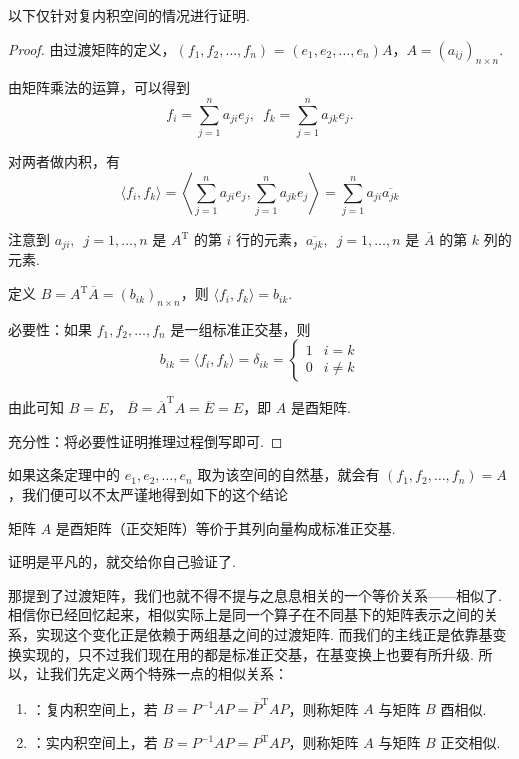 以下仅针对复内积空间的情况进行证明.

\begin{proof}
    由过渡矩阵的定义，$ (f_1, f_2, \ldots , f_n) $ = $ (e_1, e_2, \ldots , e_n)A $，$ A = (a_{ij})_{n \times n} $.

    由矩阵乘法的运算，可以得到
    \[ f_i = \sum_{j = 1}^{n} a_{ji}e_j , \enspace f_k = \sum_{j = 1}^{n} a_{jk}e_j. \]

    对两者做内积，有
    \[ \langle f_i, f_k \rangle = \left\langle \sum_{j = 1}^{n} a_{ji}e_j, \sum_{j = 1}^{n} a_{jk}e_j \right\rangle = \sum_{j = 1}^{n} a_{ji}\overline{a_{jk}} \]

    注意到 $ a_{ji},\enspace j = 1, \ldots , n $ 是 $ A^{\mathrm{T}} $ 的第 $ i $ 行的元素，$ \overline{a_{jk}},\enspace j = 1, \ldots , n $ 是 $ \overline{A} $ 的第 $ k $ 列的元素.

    定义 $ B = A^{\mathrm{T}}\overline{A} = (b_{ik})_{n \times n} $，则 $ \langle f_i, f_k \rangle = b_{ik} $.

    必要性：如果 $ f_1, f_2, \ldots , f_n $ 是一组标准正交基，则
    \[b_{ik} = \langle f_i, f_k \rangle = \delta_{ik} =
        \begin{cases}
            1 & i = k    \\
            0 & i \neq k
        \end{cases}\]

    由此可知 $ B = E $， $ \overline{B} = \overline{A}^{\mathrm{T}} A = \overline{E} = E $，即 $ A $ 是酉矩阵.

    充分性：将必要性证明推理过程倒写即可.
\end{proof}

如果这条定理中的 $ e_1, e_2, \ldots , e_n $ 取为该空间的自然基，就会有 $ (f_1, f_2, \ldots , f_n) = A $，我们便可以不太严谨地得到如下的这个结论

\begin{theorem}
    矩阵 $ A $ 是酉矩阵（正交矩阵）等价于其列向量构成标准正交基.
\end{theorem}

证明是平凡的，就交给你自己验证了.

那提到了过渡矩阵，我们也就不得不提与之息息相关的一个等价关系——相似了. 相信你已经回忆起来，相似实际上是同一个算子在不同基下的矩阵表示之间的关系，实现这个变化正是依赖于两组基之间的过渡矩阵. 而我们的主线正是依靠基变换实现的，只不过我们现在用的都是标准正交基，在基变换上也要有所升级. 所以，让我们先定义两个特殊一点的相似关系：

\begin{definition}
    \begin{enumerate}
        \item {}：复内积空间上，若 $ B = P^{-1}AP = \overline{P}^{\mathrm{T}}AP $，则称矩阵 $ A $ 与矩阵 $ B $ 酉相似.

        \item {}：实内积空间上，若 $ B = P^{-1}AP = {P}^{\mathrm{T}}AP $，则称矩阵 $ A $ 与矩阵 $ B $ 正交相似.
    \end{enumerate}
\end{definition}

